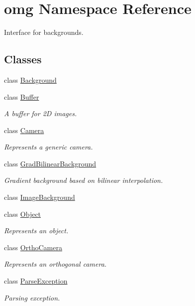 \hypertarget{namespaceomg}{}\section{omg Namespace Reference}
\label{namespaceomg}


Interface for backgrounds.  


\subsection*{Classes}
\begin{DoxyCompactItemize}
\item 
class \mbox{\hyperlink{classomg_1_1_background}{Background}}
\item 
class \mbox{\hyperlink{classomg_1_1_buffer}{Buffer}}
\begin{DoxyCompactList}\small\item\em A buffer for 2D images. \end{DoxyCompactList}\item 
class \mbox{\hyperlink{classomg_1_1_camera}{Camera}}
\begin{DoxyCompactList}\small\item\em Represents a generic camera. \end{DoxyCompactList}\item 
class \mbox{\hyperlink{classomg_1_1_grad_bilinear_background}{Grad\+Bilinear\+Background}}
\begin{DoxyCompactList}\small\item\em Gradient background based on bilinear interpolation. \end{DoxyCompactList}\item 
class \mbox{\hyperlink{classomg_1_1_image_background}{Image\+Background}}
\item 
class \mbox{\hyperlink{classomg_1_1_object}{Object}}
\begin{DoxyCompactList}\small\item\em Represents an object. \end{DoxyCompactList}\item 
class \mbox{\hyperlink{classomg_1_1_ortho_camera}{Ortho\+Camera}}
\begin{DoxyCompactList}\small\item\em Represents an orthogonal camera. \end{DoxyCompactList}\item 
class \mbox{\hyperlink{classomg_1_1_parse_exception}{Parse\+Exception}}
\begin{DoxyCompactList}\small\item\em Parsing exception. \end{DoxyCompactList}\item 

\end{DoxyCompactItemize}
